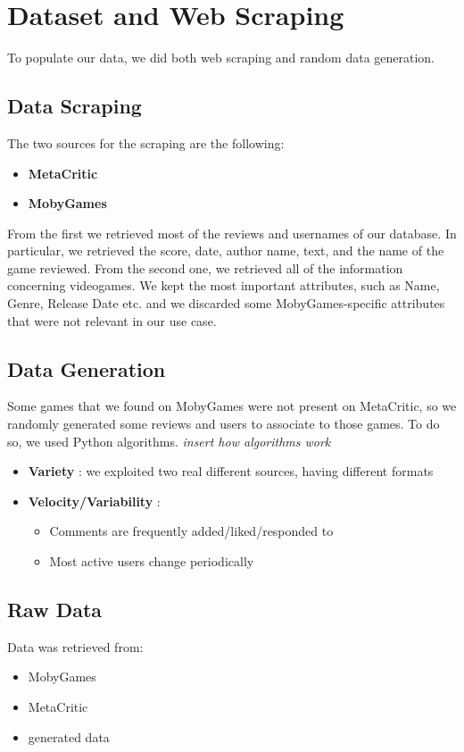 \chapter{Dataset and Web Scraping}
To populate our data, we did both web scraping and random data generation.
\section{Data Scraping}
The two sources for the scraping are the following:
\begin{itemize}
	\item \textbf{MetaCritic}
	\item \textbf{MobyGames}
\end{itemize}
From the first we retrieved most of the reviews and usernames of our database.
In particular, we retrieved the score, date, author name, text, and the name of the game reviewed.
From the second one, we retrieved all of the information concerning videogames.
We kept the most important attributes, such as Name, Genre, Release Date etc. and we discarded
some MobyGames-specific attributes that were not relevant in our use case.

\section{Data Generation}

Some games that we found on MobyGames were not present on MetaCritic, so we randomly generated some
reviews and users to associate to those games.
To do so, we used Python algorithms. 
\textit{insert how algorithms work}

\begin{itemize}
	\item \textbf{Variety} : we exploited two real different sources, having different formats 
	\item \textbf{Velocity/Variability} : 
	\begin{itemize}
		\item Comments are frequently added/liked/responded to 
		\item Most active users change periodically
	\end{itemize}
\end{itemize}
\section{Raw Data}
Data was retrieved from: 
\begin{itemize}
	\item MobyGames
	\item MetaCritic 
	\item generated data 
\end{itemize}
